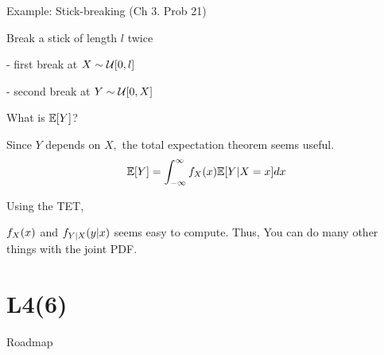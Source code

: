 \begin{frame}{Example: Stick-breaking (Ch 3. Prob 21)}

{
\plitemsep 0.1in
\bci

\item<1-> Break a stick of length $l$ twice

- first break at $X \sim \mathcal U[0,l]$

- second break at $Y \sim \mathcal U[0,X]$

\item<2->  What is $\mathbb{E}[ Y ]$?

\item<3-> Since $Y$ depends on $X,$ the total expectation theorem seems useful.
$$
\mathbb{E}[ Y ] = \int_{-\infty}^\infty f_X(x) \mathbb{E}[ Y| X=x ] dx
$$

\eci
}
{
\plitemsep 0.1in
\bci

\item<4-> Using the TET,

\item<5-> $f_X(x)$ and $f_{Y|X}(y|x)$ seems easy to compute. Thus,
You can do many other things with the joint PDF.
\eci
}


\end{frame}



\section{L4(6)}
\begin{frame}{Roadmap}

\plitemsep 0.1in
\bce[(1)]
\item {}

\item {}

\item {}

\item {}

\item {}

\item {}

\ece
\end{frame}


